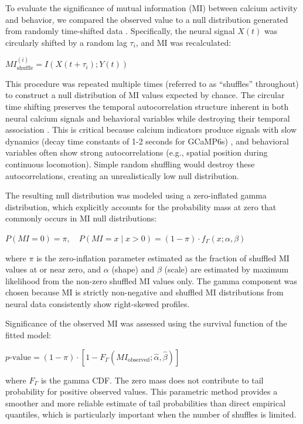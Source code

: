 To evaluate the significance of mutual information (MI) between calcium activity and
behavior, we compared the observed value to a null distribution generated from
randomly time-shifted data \cite{skaggs1993information}.
Specifically, the neural signal $X(t)$ was
circularly shifted by a random lag $\tau_i$, and MI was recalculated:

$MI_{\text{shuffle}}^{(i)} = I(X(t + \tau_i); Y(t))$

This procedure was repeated multiple times (referred to as ``shuffles'' throughout)
to construct a null distribution of MI values expected by chance. The circular time
shifting preserves the temporal
autocorrelation structure inherent in both neural calcium signals and behavioral
variables while destroying their temporal association \cite{Lancaster2018}.
This is
critical because calcium indicators produce signals with slow dynamics (decay time
constants of 1-2 seconds for GCaMP6s) \cite{Chen2013}, and behavioral variables often
show strong autocorrelations (e.g., spatial position during continuous locomotion).
Simple random shuffling would destroy these autocorrelations, creating an
unrealistically low null distribution.


The resulting null distribution was modeled using a zero-inflated gamma distribution,
which explicitly accounts for the probability mass at zero that commonly occurs in
MI null distributions:

$P(MI = 0) = \pi, \quad P(MI = x \mid x > 0) = (1 - \pi) \cdot f_\Gamma(x; \alpha, \beta)$

where $\pi$ is the zero-inflation parameter estimated as the fraction of shuffled MI
values at or near zero, and $\alpha$ (shape) and $\beta$ (scale) are estimated by
maximum likelihood from the non-zero shuffled MI values only. The gamma component
was chosen because MI is strictly non-negative and shuffled MI distributions from
neural data consistently show right-skewed profiles.

Significance of the observed MI was assessed using the survival function of the
fitted model:

$p\text{-value} = (1 - \pi) \cdot [1 - F_\Gamma(MI_{\text{observed}}; \hat{\alpha}, \hat{\beta})]$

where $F_\Gamma$ is the gamma CDF. The zero mass does not contribute to tail
probability for positive observed values. This parametric method provides a smoother
and more reliable estimate of tail probabilities than direct empirical quantiles,
which is particularly important when the number of shuffles is limited.

